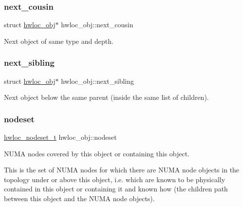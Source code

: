 \mbox{\label{a00238_a85a788017457129589318b6c39451acf}} 
\subsubsection{\texorpdfstring{next\+\_\+cousin}{next\_cousin}}
{\footnotesize\ttfamily struct \hyperlink{a00238}{hwloc\+\_\+obj}$\ast$ hwloc\+\_\+obj\+::next\+\_\+cousin}



Next object of same type and depth. 

\mbox{\label{a00238_a7f2343ed476fe4942e6fffd4cade1b40}} 
\subsubsection{\texorpdfstring{next\+\_\+sibling}{next\_sibling}}
{\footnotesize\ttfamily struct \hyperlink{a00238}{hwloc\+\_\+obj}$\ast$ hwloc\+\_\+obj\+::next\+\_\+sibling}



Next object below the same parent (inside the same list of children). 

\mbox{\label{a00238_a08f0d0e16c619a6e653526cbee4ffea3}} 
\subsubsection{\texorpdfstring{nodeset}{nodeset}}
{\footnotesize\ttfamily \hyperlink{a00183_ga37e35730fa7e775b5bb0afe893d6d508}{hwloc\+\_\+nodeset\+\_\+t} hwloc\+\_\+obj\+::nodeset}



N\+U\+MA nodes covered by this object or containing this object. 

This is the set of N\+U\+MA nodes for which there are N\+U\+MA node objects in the topology under or above this object, i.\+e. which are known to be physically contained in this object or containing it and known how (the children path between this object and the N\+U\+MA node objects).


